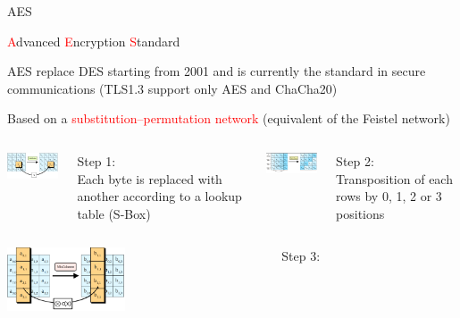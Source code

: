 \begin{frame}{AES}

\small

  \textcolor{red}{A}dvanced \textcolor{red}{E}ncryption \textcolor{red}{S}tandard

  \medskip

  AES replace DES starting from 2001 and is currently the standard in secure communications (TLS1.3 support only AES and ChaCha20)

  \medskip
  
  Based on a \textcolor{red}{substitution–permutation network} (equivalent of the Feistel network)

  \medskip
  
  \begin{columns}
  \begin{column}{0.25\textwidth}
    \includegraphics[width=3.5cm]{img/AES-1.png}
  \end{column}
  \begin{column}{0.25\textwidth}  
    Step 1: \\
    
    Each byte is replaced with another according to a lookup table (S-Box)
  \end{column}
  \begin{column}{0.25\textwidth}
    \includegraphics[width=3.5cm]{img/AES-2.png}
  \end{column}
  \begin{column}{0.25\textwidth}
    Step 2:\\
    
    Transposition of each rows by 0, 1, 2 or 3 positions
  \end{column}
  \end{columns}

  
  \begin{columns}
  \begin{column}{0.25\textwidth}
    \includegraphics[width=3.5cm]{img/AES-3.png}
  \end{column}
  \begin{column}{0.25\textwidth}
    Step 3: \\
    

\end{column}
\end{columns}
\end{frame}
